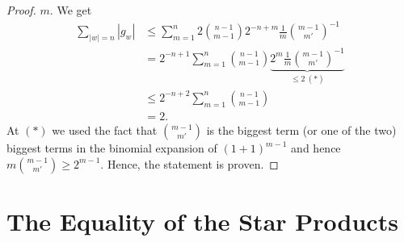 \begin{proof}
	$m$. We get
	\begin{align*}
		\sum\limits_{|w| = n}
		|g_w|
		& \leq
		\sum\limits_{m = 1}^n
		2 \binom{n-1}{m-1}
		2^{-n + m} \frac{1}{m}
		\binom{m-1}{m'}^{-1}
		\\
		& =
		2^{-n + 1}
		\sum\limits_{m = 1}^n
		\binom{n-1}{m-1}
		\underbrace{
			2^m
			\frac{1}{m}
			\binom{m-1}{m'}^{-1}
		}_{ \leq 2 \ (*)}
		\\
		& \leq
		2^{-n + 2}
		\sum\limits_{m = 1}^n
		\binom{n-1}{m-1}
		\\
		& =
		2.
	\end{align*}
	At $(*)$ we used the fact that $\binom{m-1}{m'}$ is the biggest term (or 
	one of the two) biggest terms in the binomial expansion of $(1 + 1)^{m-1}$ 
	and hence $m \binom{m-1}{m'} \geq 2^{m-1}$. Hence, the statement is 
	proven.
\end{proof}



\section{The Equality of the Star Products}
\label{sec:chap3_StarProductProof}

